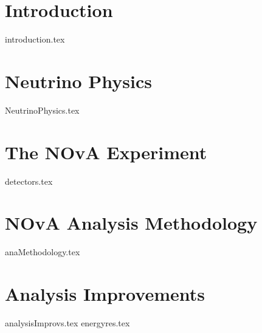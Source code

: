 \documentclass[a4paper,11pt]{report}
\newcommand{\linespacing}{1.5}
\renewcommand{\baselinestretch}{\linespacing}
\begin{document}

%
%
%

%
%
%
%
%

\newcommand{\hadefrac}{$E_{had.} / E_\nu$}

\newpage
{}


\chapter{Introduction}
{introduction.tex}

\chapter{Neutrino Physics}
{NeutrinoPhysics.tex}

\chapter{The NOvA Experiment}
{detectors.tex}

\chapter{NOvA Analysis Methodology}
{anaMethodology.tex}

\chapter{Analysis Improvements}
{analysisImprovs.tex}
{energyres.tex}
\end{document}
